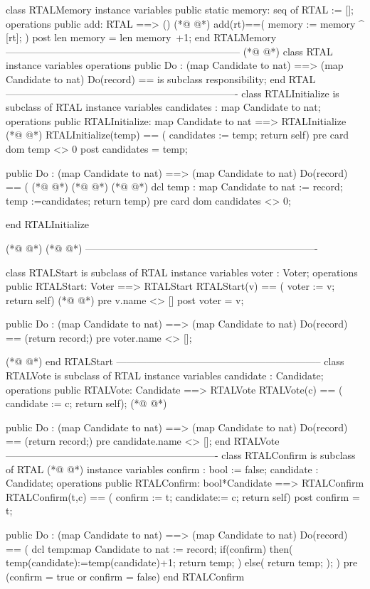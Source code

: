\begin{vdmpp}
class RTALMemory
instance variables
  public static memory: seq of RTAL := [];
operations
 public add: RTAL ==> ()
(*@
\label{add:6}
@*)
 add(rt)==(
  memory := memory ^ [rt]; 
 )
 post len memory = len memory~+1;
end RTALMemory
-----------------------------------------------------------------------
(*@
\label{RTALMemory:12}
@*)
class RTAL 
instance variables
operations
 public Do : (map Candidate to nat) ==> (map Candidate to nat)
 Do(record) == is subclass responsibility;
end RTAL
----------------------------------------------------------------------
class RTALInitialize is subclass of RTAL
instance variables
 candidates : map Candidate to nat;
operations
 public RTALInitialize: map Candidate to nat ==> RTALInitialize 
(*@
\label{Do:24}
@*)
 RTALInitialize(temp) == (
       candidates := temp;
       return self)
 pre card dom temp <> 0
 post candidates = temp;
 
 public Do :  (map Candidate to nat) ==> (map Candidate to nat)
 Do(record) ==  (
(*@
\label{RTALStart:32}
@*)
(*@
\label{RTALStart:32}
@*)
(*@
\label{RTALInitialize:32}
@*)
  dcl temp : map Candidate to nat := record;
  temp :=candidates;
  return temp)
 pre card dom candidates <> 0;
 
end RTALInitialize

(*@
\label{Do:39}
@*)
(*@
\label{Do:39}
@*)
----------------------------------------------------------------------

class RTALStart is subclass of RTAL
instance variables
 voter : Voter;
operations
 public RTALStart: Voter ==> RTALStart 
 RTALStart(v) == (
       voter := v;
       return self)
(*@
\label{RTALVote:49}
@*)
 pre v.name <> []
 post voter = v;
 
 public Do :  (map Candidate to nat) ==> (map Candidate to nat)
 Do(record) ==  (return record;)
 pre voter.name <> [];
 
(*@
\label{Do:56}
@*)
end RTALStart
--------------------------------------------------------------
class RTALVote is subclass of RTAL
instance variables
  candidate : Candidate;
operations
 public RTALVote: Candidate ==> RTALVote 
 RTALVote(c) == (
       candidate := c;
       return self);
(*@
\label{RTALConfirm:66}
@*)
 
 public Do :  (map Candidate to nat) ==> (map Candidate to nat)
 Do(record) == (return record;)
 pre candidate.name <> [];
end RTALVote
----------------------------------------------------------------
class RTALConfirm is subclass of RTAL
(*@
\label{Do:73}
@*)
instance variables 
 confirm : bool := false;
 candidate : Candidate;
operations
 public RTALConfirm: bool*Candidate ==> RTALConfirm 
 RTALConfirm(t,c) == (
       confirm := t;
       candidate:= c;
       return self)
 post confirm = t;

 public Do : (map Candidate to nat) ==> (map Candidate to nat)
 Do(record) == (
  dcl temp:map Candidate to nat := record;
  if(confirm)
  then(
   temp(candidate):=temp(candidate)+1;
   return temp;
  )
  else(
   return temp;
  );
 )
 pre (confirm = true or confirm = false)
end RTALConfirm

\end{vdmpp}

